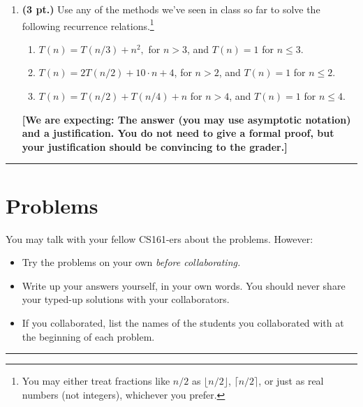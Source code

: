 \documentclass{article}
\newcommand{\expecting}[1]{\noindent\textbf{[We are expecting: #1]}}
\newcommand{\pts}[1]{\textbf{(#1 pt.)}}
\begin{document}
\begin{enumerate}
\item\pts{3} Use any of the methods we've seen in class so far to solve the following recurrence relations.\footnote{You may either treat fractions like $n/2$ as $\lfloor n/2 \rfloor$, $\lceil n/2 \rceil$, or just as real numbers (not integers), whichever you prefer.}
\begin{enumerate}
\item $T(n) = T(n/3) + n^2,$ for $n > 3$, and $T(n) = 1$ for $n \leq 3$. 
\item $T(n) = 2 T(n/2) + 10\cdot n + 4$, for $n > 2$, and $T(n) = 1$ for $n \leq 2$.
\item $T(n) = T(n/2) + T(n/4) + n$ for $n >4$, and $T(n) = 1$ for $n \leq 4$.
\end{enumerate}

\expecting{The answer (you may use asymptotic notation) and a justification.  You do not need to give a formal proof, but your justification should be convincing to the grader.}

\end{enumerate}

\noindent
\rule{\linewidth}{0.4pt}
\newpage
\section*{Problems}
You may talk with your fellow CS161-ers about the problems.  However:
\begin{itemize}
	\item Try the problems on your own \em before \em collaborating.
	\item Write up your answers yourself, in your own words.   You should never share your typed-up solutions with your collaborators.
	\item If you collaborated, list the names of the students you collaborated with at the beginning of each problem.
\end{itemize}

\noindent
\rule{\linewidth}{0.4pt}
\end{document}
